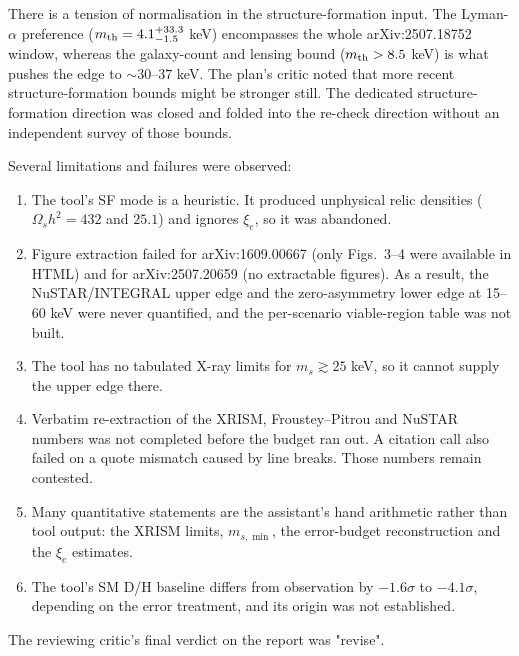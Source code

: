 \documentclass[11pt,a4paper]{article}
\begin{document}
There is a tension of normalisation in the structure-formation input. The Lyman-$\alpha$ preference ($m_{\rm th}=4.1^{+33.3}_{-1.5}$ keV) encompasses the whole arXiv:2507.18752 window, whereas the galaxy-count and lensing bound ($m_{\rm th}>8.5$ keV) is what pushes the edge to $\sim30$--$37$ keV. The plan's critic noted that more recent structure-formation bounds might be stronger still. The dedicated structure-formation direction was closed and folded into the re-check direction without an independent survey of those bounds.

Several limitations and failures were observed:
\begin{enumerate}
\item The tool's SF mode is a heuristic. It produced unphysical relic densities ($\Omega_s h^2=432$ and $25.1$) and ignores $\xi_e$, so it was abandoned.
\item Figure extraction failed for arXiv:1609.00667 (only Figs.~3--4 were available in HTML) and for arXiv:2507.20659 (no extractable figures). As a result, the NuSTAR/INTEGRAL upper edge and the zero-asymmetry lower edge at 15--60 keV were never quantified, and the per-scenario viable-region table was not built.
\item The tool has no tabulated X-ray limits for $m_s\gtrsim25$ keV, so it cannot supply the upper edge there.
\item Verbatim re-extraction of the XRISM, Froustey--Pitrou and NuSTAR numbers was not completed before the budget ran out. A citation call also failed on a quote mismatch caused by line breaks. Those numbers remain contested.
\item Many quantitative statements are the assistant's hand arithmetic rather than tool output: the XRISM limits, $m_{s,\min}$, the error-budget reconstruction and the $\xi_e$ estimates.
\item The tool's SM D/H baseline differs from observation by $-1.6\sigma$ to $-4.1\sigma$, depending on the error treatment, and its origin was not established.
\end{enumerate}
The reviewing critic's final verdict on the report was "revise".
\end{document}
